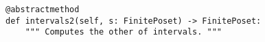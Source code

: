 \begin{verbatim}
@abstractmethod
def intervals2(self, s: FinitePoset) -> FinitePoset:
    """ Computes the other of intervals. """
\end{verbatim}